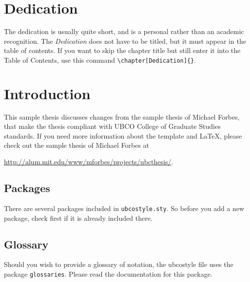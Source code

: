 \documentclass[msc,oneside]{ubcthesis}%
\begin{document}
\chapter{Dedication} %
The dedication is usually quite short, and is a personal rather than
an academic recognition.  The \emph{Dedication} does not have to be
titled, but it must appear in the table of contents.  If you want to
skip the chapter title but still enter it into the Table of Contents,
use this command \verb|\chapter[Dedication]{}|.




\mainmatter


\chapter{Introduction}
This sample thesis discusses changes from the sample thesis of Michael Forbes, that make the thesis compliant with UBCO College of Graduate Studies standards. If you need more information about the template and LaTeX, please check out the sample thesis of Michael Forbes at

\href{http://alum.mit.edu/www/mforbes/projects/ubcthesis/}{http://alum.mit.edu/www/mforbes/projects/ubcthesis/}.

\cite{MR2848848,MR2461448,MR2834159,infconv,convmono,MR2668638,Bauschke:2007-PA02,proxbas}

\section{Packages}
There are several packages included in \texttt{ubcostyle.sty}. So before you add a new package, check first if it is already included there.

\section{Glossary}
Should you wish to provide a glossary of notation, the ubcostyle file uses the package \texttt{glossaries}. Please read the documentation for this package.
\end{document}
